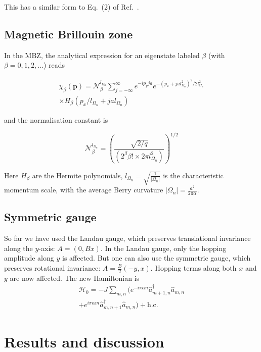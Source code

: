 \documentclass[twocolumn, 10pt, aps, superscriptaddress, floatfix, showpacs, prb, citeautoscript]{revtex4-1}
\newcommand{\vt}[1]{\mathbf{#1}}
\begin{document}
This has a similar form to Eq.~(2) of Ref.~.

\subsection{Magnetic Brillouin zone}
In the MBZ, the analytical expression for an eigenstate labeled $\beta$ (with
$\beta= 0,1,2,\dots$) reads

\begin{multline}
 \chi_\beta (\vt{p}) = \mathcal{N}_\beta^{l_{\Omega_n}} \sum_{j = -
 \infty}^{\infty} e^{- i p_y j a} e^{ - ( p_x + j a l_{\Omega_n}^2 )
 ^2 / 2 l_{\Omega_n}^2}\\
 \times H_\beta ( p_x / l_{\Omega_n} + j a
 l_{\Omega_n})
\end{multline}

and the normalisation constant is

\begin{equation}
\mathcal{N}_\beta^{l_{\Omega_n}} = \left( \frac{\sqrt{2/q}} {(2^\beta
\beta! \times 2 \pi l_{\Omega_n}^2)} \right)^{1/2}
\end{equation}

Here $H_\beta$ are the Hermite polynomials, $l_{\Omega_n} =
\sqrt{\frac{1}{|\Omega_n|}}$ is the characteristic momentum scale,
with the average Berry curvature $|\Omega_n| = \frac{a^2}{2\pi\alpha}$.

\subsection{Symmetric gauge}
So far we have used the Landau gauge, which preserves translational
invariance along the $y$-axis: $A = (0, Bx)$. In the Landau gauge,
only the hopping amplitude along $y$ is affected.  But one can also
use the symmetric gauge, which preserves rotational invariance: $A =
\frac{B}{2}(-y, x)$. Hopping terms along both $x$ and $y$ are now
affected.  The new Hamiltonian is
\begin{multline}
\mathcal{H}_0=-J\sum_{m,n}(e^{-i\pi\alpha
n}\hat{a}_{m+1,n}^{\dagger}\hat{a}_{m,n}\\
+e^{i\pi\alpha
m}\hat{a}_{m,n+1}^{\dagger}\hat{a}_{m,n}) + \text{h.c.}
\end{multline}

\section{Results and discussion}
\label{sec:results}
\end{document}
